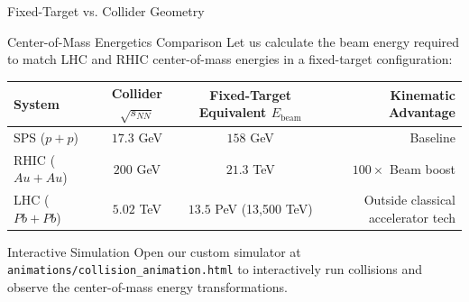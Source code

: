\documentclass[aspectratio=169]{beamer}
\begin{document}
\begin{frame}{Fixed-Target vs. Collider Geometry}
    \begin{block}{Center-of-Mass Energetics Comparison}
        Let us calculate the beam energy required to match LHC and RHIC center-of-mass energies in a fixed-target configuration:
    \end{block}
    \begin{table}
        \centering
        \footnotesize
        \begin{tabular}{lccr}
            \toprule
            \textbf{System} & \textbf{Collider $\sqrt{s_{NN}}$} & \textbf{Fixed-Target Equivalent $E_{\text{beam}}$} & \textbf{Kinematic Advantage} \\
            \midrule
            SPS ($p+p$) & $17.3$ GeV & $158$ GeV & Baseline \\
            RHIC ($Au+Au$) & $200$ GeV & $21.3$ TeV & $100 \times$ Beam boost \\
            LHC ($Pb+Pb$) & $5.02$ TeV & $13.5$ PeV (13,500 TeV) & Outside classical accelerator tech \\
            \bottomrule
        \end{tabular}
    \end{table}
    \begin{alertblock}{Interactive Simulation}
        Open our custom simulator at \texttt{animations/collision\_animation.html} to interactively run collisions and observe the center-of-mass energy transformations.
    \end{alertblock}
\end{frame}
\end{document}
